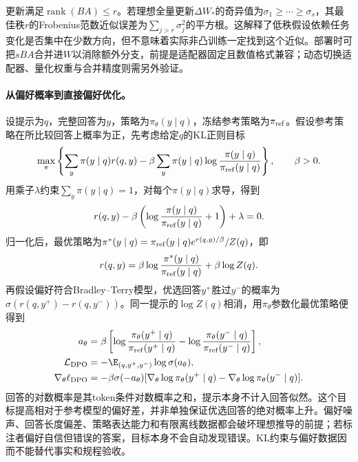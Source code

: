 更新满足$\operatorname{rank}(BA)\leq r$。若理想全量更新$\Delta W_*$的奇异值为$\sigma_1\geq\cdots\geq\sigma_s$，其最佳秩$r$的Frobenius范数近似误差为$\sum_{j>r}\sigma_j^2$的平方根。这解释了低秩假设依赖任务变化是否集中在少数方向，但不意味着实际非凸训练一定找到这个近似。部署时可把$sBA$合并进$W$以消除额外分支，前提是适配器固定且数值格式兼容；动态切换适配器、量化权重与合并精度则需另外验证。

\paragraph{从偏好概率到直接偏好优化。}
设提示为$q$，完整回答为$y$，策略为$\pi_\theta(y\mid q)$，冻结参考策略为$\pi_{\rm ref}$。假设参考策略在所比较回答上概率为正，先考虑给定$q$的KL正则目标
\begin{equation}
 \max_\pi\left\{\sum_y\pi(y\mid q)r(q,y)
 -\beta\sum_y\pi(y\mid q)\log\frac{\pi(y\mid q)}{\pi_{\rm ref}(y\mid q)}\right\},\qquad\beta>0.
\end{equation}
用乘子$\lambda$约束$\sum_y\pi(y\mid q)=1$，对每个$\pi(y\mid q)$求导，得到
\begin{equation}
 r(q,y)-\beta\left(\log\frac{\pi(y\mid q)}{\pi_{\rm ref}(y\mid q)}+1\right)+\lambda=0.
\end{equation}
归一化后，最优策略为$\pi^*(y\mid q)=\pi_{\rm ref}(y\mid q)e^{r(q,y)/\beta}/Z(q)$，即
\begin{equation}
 r(q,y)=\beta\log\frac{\pi^*(y\mid q)}{\pi_{\rm ref}(y\mid q)}+\beta\log Z(q).
\end{equation}
再假设偏好符合Bradley--Terry模型，优选回答$y^+$胜过$y^-$的概率为$\sigma(r(q,y^+)-r(q,y^-))$。同一提示的$\log Z(q)$相消，用$\pi_\theta$参数化最优策略便得到
\begin{align}
 a_\theta&=\beta\left[\log\frac{\pi_\theta(y^+\mid q)}{\pi_{\rm ref}(y^+\mid q)}-
 \log\frac{\pi_\theta(y^-\mid q)}{\pi_{\rm ref}(y^-\mid q)}\right],\\
 \mathcal L_{\rm DPO}&=-\E_{(q,y^+,y^-)}\log\sigma(a_\theta),\\
 \nabla_\theta\ell_{\rm DPO}&=-\beta\sigma(-a_\theta)
 [\nabla_\theta\log\pi_\theta(y^+\mid q)-\nabla_\theta\log\pi_\theta(y^-\mid q)].
\end{align}
回答的对数概率是其token条件对数概率之和，提示本身不计入回答似然。这个目标提高相对于参考模型的偏好差，并非单独保证优选回答的绝对概率上升。偏好噪声、回答长度偏差、策略表达能力和有限离线数据都会破坏理想推导的前提；若标注者偏好自信但错误的答案，目标本身不会自动发现错误。KL约束与偏好数据因而不能替代事实和规程验收。

